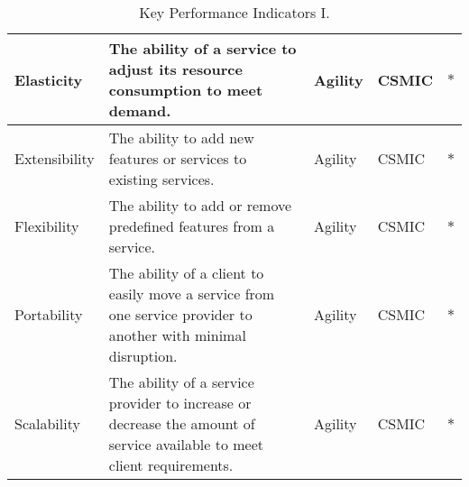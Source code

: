 \begin{sidewaystable}[!ht]
\begin{center}
\begin{tabular}[c]{|p{2.5cm}|p{9cm}|p{1.5cm}|p{1.5cm}|p{1.5cm}|}
  Elasticity&The ability of a service to adjust its resource consumption to meet demand.&Agility&CSMIC&$\ast$ \\ \hline 
  Extensibility&The ability to add new features or services to existing services.&Agility&CSMIC&$\ast$ \\ \hline 
  Flexibility&The ability to add or remove predefined features from a service.&Agility&CSMIC&$\ast$ \\ \hline 
  Portability&The ability of a client to easily move a service from one service provider to another with minimal disruption.&Agility&CSMIC&$\ast$ \\ \hline 
  Scalability&The ability of a service provider to increase or decrease the amount of service available to meet client requirements.&Agility&CSMIC&$\ast$ \\ \hline 
\hline
\end{tabular}
\caption{Key Performance Indicators I.}\label{table:kpi-1}
  \end{center}
\end{sidewaystable} 

